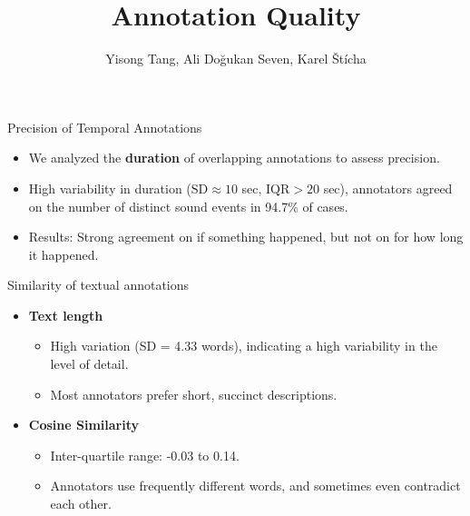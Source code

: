 \documentclass[aspectratio=169, 10pt]{beamer}
\title{Annotation Quality}
\date{}
\author{Yisong Tang, Ali Doğukan Seven, Karel Štícha}
\begin{document}
\maketitle

\begin{frame}{Precision of Temporal Annotations}
\begin{itemize}
    \item We analyzed the \textbf{duration} of overlapping annotations to assess precision.
    \item High variability in duration (\( \text{SD} \approx 10 \) sec, \( \text{IQR} > 20 \) sec), annotators agreed on the number of distinct sound events in 94.7\% of cases.
    \item Results: Strong agreement on if something happened, but not on for how long it happened.
\end{itemize}
\end{frame}



\begin{frame}{Similarity of textual annotations}
    \begin{itemize}
        \item \textbf{Text length}
            \begin{itemize}
                \item High variation (SD = 4.33 words), indicating a high variability in the level of detail.
                \item Most annotators prefer short, succinct descriptions.
            \end{itemize}

        \vspace{.5cm}
        \item \textbf{Cosine Similarity}
            \begin{itemize}
                \item Inter-quartile range: -0.03 to 0.14.
                \item Annotators use frequently different words, and sometimes even contradict each other.
            \end{itemize}        
    \end{itemize}
\end{frame}
\end{document}

